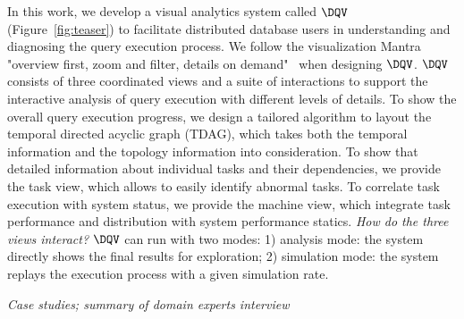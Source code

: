 

In this work, we develop a visual analytics system called $\DQV$ (Figure~\ref{fig:teaser}) to facilitate distributed database users in understanding and diagnosing the query execution process. We follow the visualization Mantra "overview first, zoom and filter, details on demand"~\cite{shneiderman2003eyes} when designing $\DQV$. $\DQV$ consists of three coordinated views and a suite of interactions to support the interactive analysis of query execution with different levels of details. To show the overall query execution progress, we design a tailored algorithm to layout the temporal directed acyclic graph (TDAG), which takes both the temporal information and the topology information into consideration. To show that detailed information about individual tasks and their dependencies, we provide the task view, which allows to easily identify abnormal tasks. To correlate task execution with system status, we provide the machine view, which integrate task performance and distribution with system performance statics.\textit{ How do the three views interact?}
$\DQV$ can run with two modes: 1) analysis mode: the system directly shows the final results for exploration; 2) simulation mode: the system replays the execution process with a given simulation rate.

\textit{Case studies; summary of domain experts interview}

